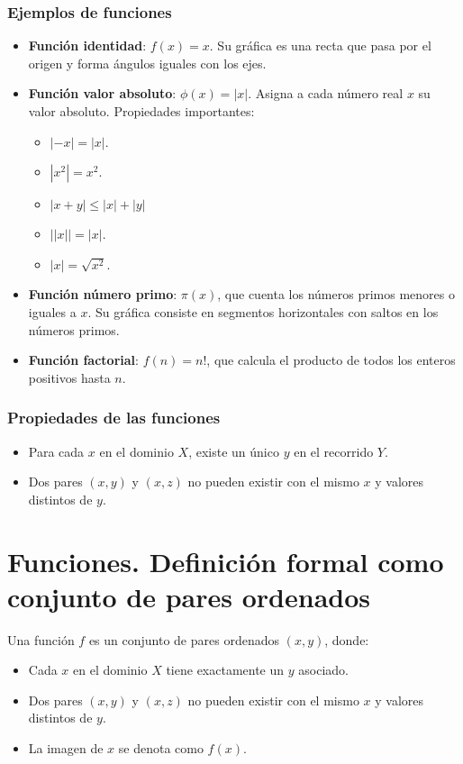 \subsubsection*{Ejemplos de funciones}
\begin{itemize}
    \item \textbf{Función identidad}: $f(x) = x$. Su gráfica es una recta que pasa por el origen y forma ángulos iguales con los ejes.
    \item \textbf{Función valor absoluto}: $\phi(x) = |x|$. Asigna a cada número real $x$ su valor absoluto. Propiedades importantes:
    \begin{itemize}
        \item \( | -x | = |x| \).
        \item \( |x^2| = x^2 \).
        \item \( |x + y| \leq |x| + |y| \)
        \item \( ||x|| = |x| \).
        \item \( |x| = \sqrt{x^2} \).
    \end{itemize}

    \item \textbf{Función número primo}: $\pi(x)$, que cuenta los números primos menores o iguales a $x$. Su gráfica consiste en segmentos horizontales con saltos en los números primos.
    \item \textbf{Función factorial}: $f(n) = n!$, que calcula el producto de todos los enteros positivos hasta $n$.
\end{itemize}

\subsubsection*{Propiedades de las funciones}
\begin{itemize}
    \item Para cada $x$ en el dominio $X$, existe un único $y$ en el recorrido $Y$.
    \item Dos pares $(x, y)$ y $(x, z)$ no pueden existir con el mismo $x$ y valores distintos de $y$.
\end{itemize}

\section{Funciones. Definición formal como conjunto de pares ordenados}

Una función \( f \) es un conjunto de pares ordenados \( (x,y) \), donde:
\begin{itemize}
    \item Cada \( x \) en el dominio \( X \) tiene exactamente un \( y \) asociado.
    \item Dos pares \( (x,y) \) y \( (x,z) \) no pueden existir con el mismo \( x \) y valores distintos de \( y \).
    \item La imagen de  \( x \) se denota como \( f(x) \).
\end{itemize}

